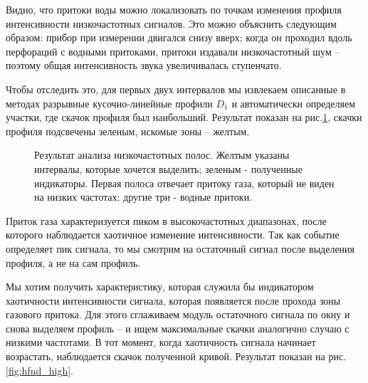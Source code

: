 \par
Видно, что притоки воды можно локализовать по точкам изменения профиля интенсивности низкочастотных сигналов. Это можно объяснить следующим образом: прибор при измерении двигался снизу вверх; когда он проходил вдоль перфораций с водными притоками, притоки издавали низкочастотный шум – поэтому общая интенсивность звука увеличивалась ступенчато.
\par
Чтобы отследить это, для первых двух интервалов мы извлекаем описанные в методах разрывные кусочно-линейные профили $D_1$ и автоматически определяем участки, где скачок профиля был наибольший. Результат показан на рис.\ref{fig:hfnd_low}, скачки профиля подсвечены зеленым, искомые зоны – желтым.

\begin{figure}[H]
\centering
{}
\vfil\vskip -20pt
\vfil\vskip -20pt
\caption{Результат анализа низкочастотных полос. Желтым указаны интервалы, которые хочется выделить; зеленым - полученные индикаторы. Первая полоса отвечает притоку газа, который не виден на низких частотах; другие три - водные притоки.}
\label{fig:hfnd_low}
\end{figure}

\par
Приток газа характеризуется пиком в высокочастотных диапазонах, после которого наблюдается хаотичное изменение интенсивности. Так как событие определяет пик сигнала, то мы смотрим на остаточный сигнал после выделения профиля, а не на сам профиль. 
\par
Мы хотим получить характеристику, которая служила бы индикатором хаотичности интенсивности сигнала, которая появляется после прохода зоны газового притока. Для этого сглаживаем модуль остаточного сигнала по окну и снова выделяем профиль – и ищем максимальные скачки аналогично случаю с низкими частотами. В тот момент, когда хаотичность сигнала начинает возрастать, наблюдается скачок полученной кривой. Результат показан на рис.\ref{fig:hfnd_high}.

